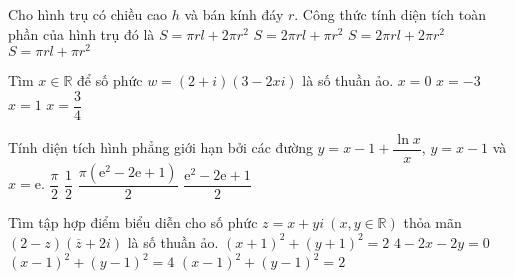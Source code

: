 	\begin{ex}%
		Cho hình trụ có chiều cao $h$ và bán kính đáy $r$. Công thức tính diện tích toàn phần của hình trụ đó là		
		\choice
		{$S=\pi rl+2\pi r^2$}
		{$S=2\pi rl+\pi r^2$}
		{\True $S=2\pi rl+2\pi r^2$}
		{$S=\pi rl+\pi r^2$}
	\end{ex}
\begin{ex}%
		Tìm $x \in \mathbb{R}$ để số phức $w=(2+i)(3-2xi)$ là số thuần ảo.
	\choice
	{$x=0$}
	{\True $x=-3$}
	{$x=1$}
	{$x=\dfrac{3}{4}$}
\end{ex}
	\begin{ex}%
		Tính diện tích hình phẳng giới hạn bởi các đường $y=x-1+\dfrac{\ln x}{x}$, $y=x-1$ và $x=\mathrm{e}$.
		\choice
		{$\dfrac{\pi}{2}$}
		{\True $\dfrac{1}{2}$}
		{$\dfrac{\pi(\mathrm{e}^2-2\mathrm{e}+1)}{2}$}
		{$\dfrac{\mathrm{e}^2-2\mathrm{e}+1}{2}$}
	\end{ex}
	\begin{ex}%
		Tìm tập hợp điểm biểu diễn cho số phức $z=x+yi\ (x,y\in\mathbb{R})$ thỏa mãn $(2-z)(\overline{z}+2i)$ là số thuần ảo. 
		\choice
		{$(x+1)^2+(y+1)^2=2$}
		{$4-2x-2y=0$}
		{$(x-1)^2+(y-1)^2=4$}
		{\True $(x-1)^2+(y-1)^2=2$}
	\end{ex}
